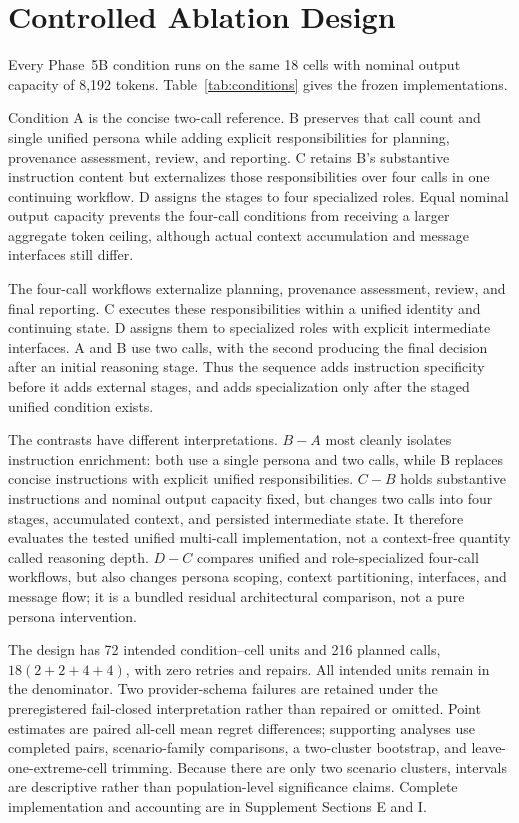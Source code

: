 \section{Controlled Ablation Design}
\label{sec:ablation}

Every Phase~5B condition runs on the same 18 cells with nominal output
capacity of 8,192 tokens.  Table~\ref{tab:conditions} gives the frozen
implementations.



Condition A is the concise two-call reference.  B preserves that call count
and single unified persona while adding explicit responsibilities for
planning, provenance assessment, review, and reporting.  C retains B's
substantive instruction content but externalizes those responsibilities over
four calls in one continuing workflow.  D assigns the stages to four
specialized roles.  Equal nominal output capacity prevents the four-call
conditions from receiving a larger aggregate token ceiling, although actual
context accumulation and message interfaces still differ.

The four-call workflows externalize planning, provenance assessment, review,
and final reporting.  C executes these responsibilities within a unified
identity and continuing state.  D assigns them to specialized roles with
explicit intermediate interfaces.  A and B use two calls, with the second
producing the final decision after an initial reasoning stage.  Thus the
sequence adds instruction specificity before it adds external stages, and adds
specialization only after the staged unified condition exists.

The contrasts have different interpretations.  \(B-A\) most cleanly isolates
instruction enrichment: both use a single persona and two calls, while B
replaces concise instructions with explicit unified responsibilities.
\(C-B\) holds substantive instructions and nominal output capacity fixed, but
changes two calls into four stages, accumulated context, and persisted
intermediate state.  It therefore evaluates the tested unified multi-call
implementation, not a context-free quantity called reasoning depth.
\(D-C\) compares unified and role-specialized four-call workflows, but also
changes persona scoping, context partitioning, interfaces, and message flow;
it is a bundled residual architectural comparison, not a pure persona
intervention.

The design has 72 intended condition--cell units and 216 planned calls,
\(18(2+2+4+4)\), with zero retries and repairs.  All intended units remain in
the denominator.  Two provider-schema failures are retained under the
preregistered fail-closed interpretation rather than repaired or omitted.
Point estimates are paired all-cell mean regret differences; supporting
analyses use completed pairs, scenario-family comparisons, a two-cluster
bootstrap, and leave-one-extreme-cell trimming.  Because there are only two
scenario clusters, intervals are descriptive rather than population-level
significance claims.  Complete implementation and accounting are in
Supplement Sections E and I.

